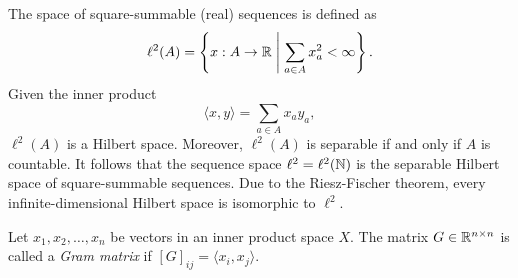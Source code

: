 \begin{example}
    \cite{rudin1987real} %
    The space of square-summable (real) sequences is defined as
    \begin{equation}
        \label{eqn:l2-space}
        \ell^2(A) = \left\{
            x : A \to \mathbb{R} \;\middle\vert\; \sum_{a \in A} x_a^2 < \infty
        \right\}.
    \end{equation}
    Given the inner product
    \begin{equation}
        \label{eqn:l2-inner-product}
        \langle x, y \rangle = \sum_{a \in A} x_a y_a,
    \end{equation}
    \(\ell^2(A)\) is a Hilbert space.
    Moreover, \(\ell^2(A)\) is separable if and only if \(A\) is countable.
    It follows that the sequence space \(\ell^2 = \ell^2(\mathbb{N})\) is the separable Hilbert space of square-summable sequences.
    Due to the Riesz-Fischer theorem, every infinite-dimensional Hilbert space is isomorphic to \(\ell^2\).
\end{example}

\begin{definition}
    \cite{horn2013matrix}
    Let \(x_1, x_2, \dots, x_n\) be vectors in an inner product space \(X\).
    The matrix \(G \in \mathbb{R}^{n \times n}\) is called a \textit{Gram matrix} if \([G]_{ij} = \langle x_i, x_j \rangle\).
\end{definition}

